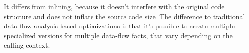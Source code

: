 It differs from inlining, because it doesn't interfere with the original code structure and does not inflate the source code size. The difference to traditional data-flow analysis based optimizations is that it's possible to create multiple specialized versions for multiple data-flow facts, that vary depending on the calling context.   